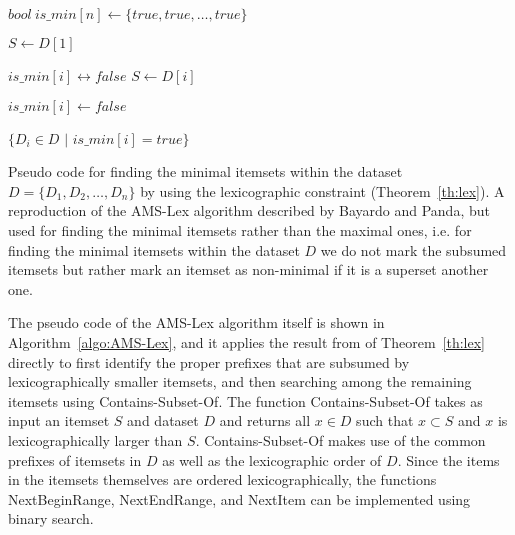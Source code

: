 \documentclass[13pt,a4paper]{article}
\begin{document}
\begin{algorithm} [t]
\SetAlgoNoLine
{}
{
	
	\nl $bool~is\_min[n] \longleftarrow \{true, true, \dots, true\}$\;
	
	\nl $S \longleftarrow D[1]$\;
	
	\nl {}
	{
		\nl {}
		{
			\nl $is\_min[i] \longleftrightarrow false$\;
		}
		\Else
		{
			\nl $S \longleftarrow D[i]$\;
		}
	}
	
	\nl {}
	{
		\nl {}
		{
			\nl $is\_min[i] \longleftarrow false$\;
		}
	}
	
	\nl \KwRet $ \{ D_i \in D$ $\lvert$ $is\_min[i] = true \}$\;
}
\caption{Pseudo code for finding the minimal itemsets within the dataset $D = \{  D_1, D_2, \dots, D_{n} \}$ by using the lexicographic constraint (Theorem~\ref{th:lex}). A reproduction of the AMS-Lex algorithm described by Bayardo and Panda, but used for finding the minimal itemsets rather than the maximal ones, i.e. for finding the minimal itemsets within the dataset $D$ we do not mark the subsumed itemsets but rather mark an itemset as non-minimal if it is a superset another one.}
\label{algo:AMS-Lex}
\end{algorithm}

The pseudo code of the AMS-Lex algorithm itself is shown in Algorithm~\ref{algo:AMS-Lex}, and it applies the result from of Theorem~\ref{th:lex} directly to first identify the proper prefixes that are subsumed by lexicographically smaller itemsets, and then searching among the remaining itemsets using Contains-Subset-Of. The function Contains-Subset-Of takes as input an itemset $S$ and dataset $D$ and returns all $x \in D$ such that $x \subset S$ and $x$ is lexicographically larger than $S$. Contains-Subset-Of makes use of the common prefixes of itemsets in $D$ as well as the lexicographic order of $D$. Since the items in the itemsets themselves are ordered lexicographically, the functions NextBeginRange, NextEndRange, and NextItem can be implemented using binary search. 
\end{document}
